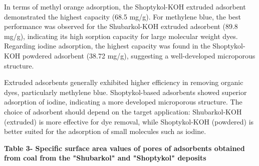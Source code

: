 
In terms of methyl orange adsorption, the Shoptykol-KOH extruded
adsorbent demonstrated the highest capacity (68.5 mg/g). For methylene
blue, the best performance was observed for the Shubarkol-KOH extruded
adsorbent (89.8 mg/g), indicating its high sorption capacity for large
molecular weight dyes. Regarding iodine adsorption, the highest capacity
was found in the Shoptykol-KOH powdered adsorbent (38.72 mg/g),
suggesting a well-developed microporous structure.

Extruded adsorbents generally exhibited higher efficiency in removing
organic dyes, particularly methylene blue. Shoptykol-based adsorbents
showed superior adsorption of iodine, indicating a more developed
microporous structure. The choice of adsorbent should depend on the
target application: Shubarkol-KOH (extruded) is more effective for dye
removal, while Shoptykol-KOH (powdered) is better suited for the
adsorption of small molecules such as iodine.

{\bfseries Table 3- Specific surface area values \hspace{0pt}\hspace{0pt}of
pores of adsorbents obtained from coal from the "Shubarkol" and
"Shoptykol" deposits}

